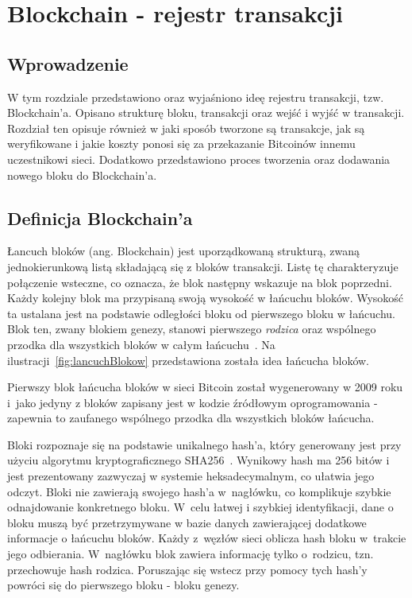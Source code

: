 \documentclass[12pt, oneside, final, openany]{mgr}
\begin{document}
\chapter{Blockchain - rejestr transakcji}
\label{blockchain}

\section{Wprowadzenie}
\indent W tym rozdziale przedstawiono oraz wyjaśniono ideę rejestru transakcji, tzw. Blockchain'a. Opisano strukturę bloku, transakcji oraz wejść i wyjść w transakcji. Rozdział ten opisuje również w jaki sposób tworzone są transakcje, jak są weryfikowane i jakie koszty ponosi się za przekazanie Bitcoinów innemu uczestnikowi sieci. Dodatkowo przedstawiono proces tworzenia oraz dodawania nowego bloku do Blockchain'a. 

\section{Definicja Blockchain'a}
\label{definicjaBlockchaina}
\indent Łancuch bloków (ang. Blockchain) jest uporządkowaną strukturą, zwaną jednokierunkową listą składającą się z bloków transakcji. Listę tę charakteryzuje połączenie wsteczne, co oznacza, że blok następny wskazuje na blok poprzedni. Każdy kolejny blok ma przypisaną swoją wysokość w łańcuchu bloków. Wysokość ta ustalana jest na podstawie odległości bloku od pierwszego bloku w łańcuchu. Blok ten, zwany blokiem genezy, stanowi pierwszego \textit{rodzica} oraz wspólnego przodka dla wszystkich bloków w całym łańcuchu~\cite{BitcoinAndCryptocurrencyTechnologies, BlockchainExplained, BitcoinAndTheBlockchain}. Na ilustracji~\ref{fig:lancuchBlokow} przedstawiona została idea łańcucha bloków.

\indent Pierwszy blok łańcucha bloków w sieci Bitcoin został wygenerowany w 2009 roku i~jako jedyny z bloków zapisany jest w kodzie źródłowym oprogramowania - zapewnia to zaufanego wspólnego przodka dla wszystkich bloków łańcucha.

\indent Bloki rozpoznaje się na podstawie unikalnego hash'a, który generowany jest przy użyciu algorytmu kryptograficznego SHA256~\cite{sha2}. Wynikowy hash ma 256 bitów i jest prezentowany zazwyczaj w systemie heksadecymalnym, co ułatwia jego odczyt. Bloki nie zawierają swojego hash'a w~nagłówku, co komplikuje szybkie odnajdowanie konkretnego bloku. W~celu łatwej i szybkiej identyfikacji, dane o bloku muszą być przetrzymywane w bazie danych zawierającej dodatkowe informacje o łańcuchu bloków. Każdy z~węzłów sieci oblicza hash bloku w~trakcie jego odbierania. W~nagłówku blok zawiera informację tylko o~rodzicu, tzn. przechowuje hash rodzica. Poruszając się wstecz przy pomocy tych hash'y powróci się do pierwszego bloku - bloku genezy. 
\end{document}
